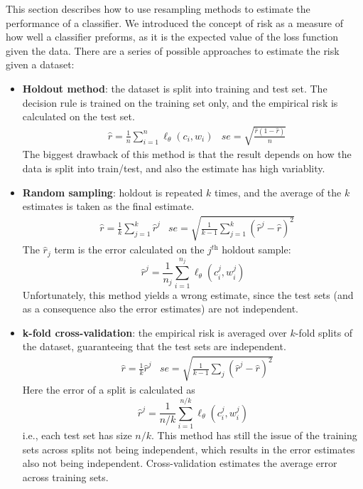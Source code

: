 This section describes how to use resampling methods to estimate the performance of a classifier. We introduced the concept of risk as a measure of how well a classifier preforms, as it is the expected value of the loss function given the data. There are a series of possible approaches to estimate the risk given a dataset:
\begin{itemize}
    \item \textbf{Holdout method}: the dataset is split into training and test set. The decision rule is trained on the training set only, and the empirical risk is calculated on the test set.
    \begin{align*}
        &\hat{r} = \frac{1}{n} \sum_{i=1}^n \ell_{\theta}(c_i, w_i) &se = \sqrt{\frac{\hat{r}(1-\hat{r})}{n}}
    \end{align*}
    The biggest drawback of this method is that the result depends on how the data is split into train/test, and also the estimate has high variablity.
    \item \textbf{Random sampling}: holdout is repeated $k$ times, and the average of the $k$ estimates is taken as the final estimate.
    \begin{align*}
        &\hat{r} = \frac{1}{k} \sum_{j=1}^k \hat{r}^j &se = \sqrt{\frac{1}{k-1}\sum_{j=1}^k (\hat{r}^j - \hat{r})^2}
    \end{align*}
    The $\hat{r}_j$ term is the error calculated on the $j^{\textit{th}}$ holdout sample:
    \begin{equation*}
        \hat{r}^j = \frac{1}{n_j} \sum_{i=1}^{n_j} \ell_{\theta}(c_i^j, w_i^j)
    \end{equation*}
    Unfortunately, this method yields a wrong estimate, since the test sets (and as a consequence also the error estimates) are not independent.
    \item \textbf{k-fold cross-validation}: the empirical risk is averaged over $k$-fold splits of the dataset, guaranteeing that the test sets are independent.
    \begin{align*}
        &\hat{r} = \frac{1}{k} \hat{r}^j &se = \sqrt{\frac{1}{k-1} \sum_{j} (\hat{r}^j - \hat{r})^2}
    \end{align*}
    Here the error of a split is calculated as
    \begin{equation*}
        \hat{r}^j = \frac{1}{n/k} \sum_{i=1}^{n/k} \ell_{\theta}(c_i^j, w_i^j)
    \end{equation*}
    i.e., each test set has size $n/k$. This method has still the issue of the training sets across splits not being independent, which results in the error estimates also not being independent. Cross-validation estimates the average error across training sets.


\end{itemize}
